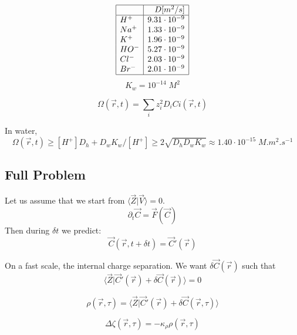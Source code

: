 \documentclass[aps,12pt]{revtex4}
\begin{document}
\begin{equation}
\begin{array}{|l|r|}
\hline
 \text{} & D[m^2/s]  \\
 \hline
 	H^+	 &9.31\cdot10^{-9}	\\
 	Na^+ &1.33\cdot10^{-9}	 \\
 	K^+	 &1.96\cdot10^{-9}	 \\
 	HO^- &5.27\cdot10^{-9}	 \\
 	Cl^- & 2.03\cdot10^{-9} \\
 	Br^- & 2.01\cdot10^{-9} \\
\hline
\end{array}
\end{equation}
$$
	K_w = 10^{-14}\; M^2
$$

\begin{equation}
	\Omega(\vec r,t) = \sum_i z_i^2 D_i Ci(\vec r, t)
\end{equation}

In water,
\begin{equation}
	\Omega(\vec r,t) \geq [H^+] D_h + D_w K_w/[H^+]  \geq 2 \sqrt{D_h D_w K_w} \approx 1.40 \cdot 10^{-15} \; M.m^2.s^{-1} 
\end{equation}

\subsection{Full Problem}

Let us assume that we start from $\langle \vec Z \vert \vec V \rangle = 0$.
\begin{equation}
	\partial_t \vec C = \vec F ( \vec C )
\end{equation}
Then during $\delta t$ we predict:
\begin{equation}
	\vec C (\vec r, t+\delta t) = \vec C ' (\vec r)
\end{equation}

On a fast scale, the internal charge separation.
We want $\delta \vec C(\vec r)$ such that
\begin{equation}
	\langle \vec Z \vert \vec C' (\vec r) + \delta \vec C(\vec r) \rangle = 0
\end{equation}

\begin{equation}
	\rho(\vec r,\tau) = \langle \vec Z \vert \vec C' (\vec r) + \delta \vec C(\vec r,\tau) \rangle
\end{equation}

\begin{equation}
	\Delta \zeta(\vec r, \tau) = - \kappa_\rho \rho(\vec r,\tau)
\end{equation}
\end{document}
